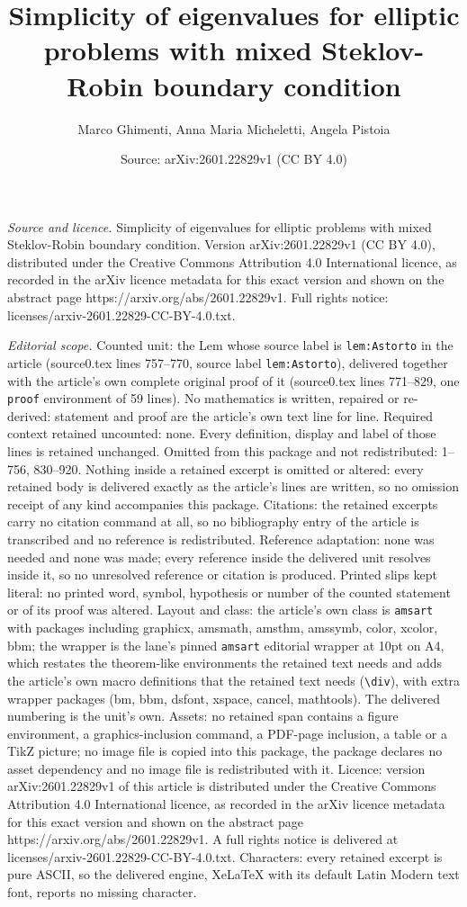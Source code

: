 \documentclass[10pt,a4paper]{amsart}
\title[Simplicity of eigenvalues for elliptic problems with mixed S]{Simplicity of eigenvalues for elliptic problems with mixed Steklov-Robin boundary condition}
\author{Marco Ghimenti, Anna Maria Micheletti, Angela Pistoia}
\date{Source: arXiv:2601.22829v1 (CC BY 4.0)}
\begin{document}
\maketitle

\noindent\emph{Source and licence.} Simplicity of eigenvalues for elliptic problems with mixed Steklov-Robin boundary condition. Version arXiv:2601.22829v1 (CC BY 4.0), distributed under the Creative Commons Attribution 4.0 International licence, as recorded in the arXiv licence metadata for this exact version and shown on the abstract page https://arxiv.org/abs/2601.22829v1. Full rights notice: licenses/arxiv-2601.22829-CC-BY-4.0.txt.\par\smallskip

\noindent\textit{Editorial scope.} Counted unit: the Lem whose source label is \texttt{lem:Astorto} in the article (source0.tex lines 757--770, source label \texttt{lem:Astorto}), delivered together with the article's own complete original proof of it (source0.tex lines 771--829, one \texttt{proof} environment of 59 lines). No mathematics is written, repaired or re-derived: statement and proof are the article's own text line for line. Required context retained uncounted: none. Every definition, display and label of those lines is retained unchanged. Omitted from this package and not redistributed: 1--756, 830--920. Nothing inside a retained excerpt is omitted or altered: every retained body is delivered exactly as the article's lines are written, so no omission receipt of any kind accompanies this package. Citations: the retained excerpts carry no citation command at all, so no bibliography entry of the article is transcribed and no reference is redistributed. Reference adaptation: none was needed and none was made; every reference inside the delivered unit resolves inside it, so no unresolved reference or citation is produced. Printed slips kept literal: no printed word, symbol, hypothesis or number of the counted statement or of its proof was altered. Layout and class: the article's own class is \texttt{amsart} with packages including graphicx, amsmath, amsthm, amssymb, color, xcolor, bbm; the wrapper is the lane's pinned \texttt{amsart} editorial wrapper at 10pt on A4, which restates the theorem-like environments the retained text needs and adds the article's own macro definitions that the retained text needs (\texttt{\textbackslash div}), with extra wrapper packages (bm, bbm, dsfont, xspace, cancel, mathtools). The delivered numbering is the unit's own. Assets: no retained span contains a figure environment, a graphics-inclusion command, a PDF-page inclusion, a table or a TikZ picture; no image file is copied into this package, the package declares no asset dependency and no image file is redistributed with it. Licence: version arXiv:2601.22829v1 of this article is distributed under the Creative Commons Attribution 4.0 International licence, as recorded in the arXiv licence metadata for this exact version and shown on the abstract page https://arxiv.org/abs/2601.22829v1. A full rights notice is delivered at licenses/arxiv-2601.22829-CC-BY-4.0.txt. Characters: every retained excerpt is pure ASCII, so the delivered engine, XeLaTeX with its default Latin Modern text font, reports no missing character.
\end{document}
